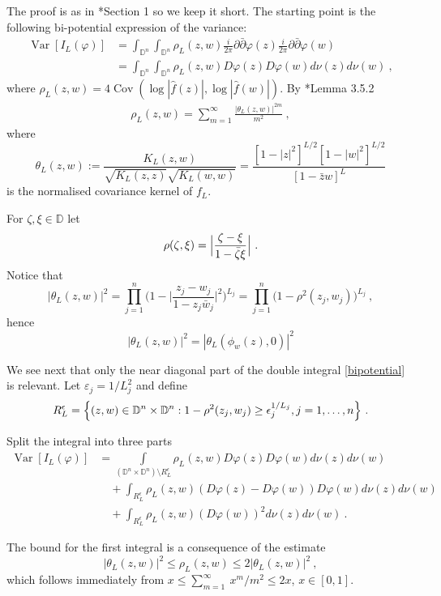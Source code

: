 \documentclass[12pt,twoside,final,amsfonts]{amsart}
\theoremstyle{plain}
\theoremstyle{definition}
\theoremstyle{definition}
\begin{document}
The proof is as in \cite{BMP}*{Section 1} so we keep it short. The starting point is the following bi-potential expression of the variance:
\begin{align}\label{bipotential}
 {\operatorname{Var}}[I_L(\varphi)]&=
 \int_{{\mathbb{D}}^n}\int_{{\mathbb{D}}^n}  \rho_L(z,w) \frac i{2\pi}\partial\bar\partial\varphi(z) \frac i{2\pi}\partial\bar\partial\varphi (w)\\
 &=\int_{{\mathbb{D}}^n}\int_{{\mathbb{D}}^n}  \rho_L(z,w) D\varphi(z) D\varphi(w) d\nu(z) d\nu(w) \ , \nonumber
\end{align}
where $\rho_L(z,w)=4{\operatorname{Cov}} (\log|\hat f(z)|,\log|\hat f(w)|)$. By \cite{HKPV}*{Lemma 3.5.2}
\begin{align*}
  \rho_L(z,w)=\sum_{m=1}^\infty\frac{|\theta_L(z,w)|^{2m}}{m^2}\ ,
 \end{align*}
 where
\begin{equation}\label{norm-kernel}
\theta_L(z,w):=\frac{K_L(z,w)}{\sqrt{K_L(z,z)} \sqrt{K_L(w,w)}}=\frac{[1-|z|^2]^{L/2} [1-|w|^2]^{L/2}}{[1-\bar z w]^L}
\end{equation}
is the normalised covariance kernel of $f_L$.

For $\zeta,\xi\in{\mathbb{D}}$ let
\[
 \rho(\zeta,\xi)=\Bigl|\frac{\zeta-\xi}{1-\bar \zeta\xi}\Bigr|\ .
\]
Notice  that
\[
 |\theta_L(z,w)|^2=\prod_{j=1}^n \bigl(1-\bigl|\frac{z_j-w_j}{1-z_j\bar w_j}\bigr|^2\bigr)^{L_j}
 =\prod_{j=1}^n \bigl(1-\rho^2(z_j,w_j)\bigr)^{L_j}\ ,
\]
hence
\[
 |\theta_L(z,w)|^2=|\theta_L(\phi_w(z), 0)|^2
\]

We see next that only the near diagonal part of the double integral \eqref{bipotential} is relevant.
Let $\varepsilon_{j}=1/L_j^{2}$ and define
\[
 R_L^\epsilon=\Bigl\{(z,w)\in {\mathbb{D}}^n\times {\mathbb{D}}^n : 1-\rho^2(z_j,w_j)\geq \epsilon_j^{1/L_j}, j=1,\dots, n\Bigr\}\ .
\]

Split the integral into three parts
\begin{align}
  {\operatorname{Var}}[I_L(\varphi)]&=\int\limits_{({\mathbb{D}}^n\times {\mathbb{D}}^n)\setminus R_L^\epsilon} \rho_L(z,w) D\varphi(z) D\varphi(w) d\nu(z) d\nu(w) \tag{I1} \\
  &\quad + \int_{R_L^\epsilon} \rho_L(z,w) (D\varphi(z)-D\varphi(w)) D\varphi(w) d\nu(z) d\nu(w) \tag{I2}\\
  &\quad + \int_{R_L^\epsilon} \rho_L(z,w) ( D\varphi(w))^2 d\nu(z) d\nu(w)\tag{I3}\ .
\end{align}

The bound for the first integral is a consequence of the estimate
\begin{equation}\label{est-rho}
 |\theta_L(z,w)|^2 \leq \rho_L(z,w)\leq 2 |\theta_L(z,w)|^2\ ,
\end{equation}
which follows immediately from $x\leq\sum_{m=1}^\infty\ x^m/m^2 \leq 2x$, $ x\in[0,1]$.
\end{document}
